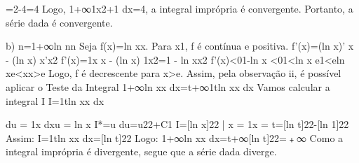                                  =2-4=4
         Logo, 1+∞1x2+1 dx=4, a integral imprópria é convergente.
         Portanto, a série dada é convergente.


        b) n=1+∞ln nn
            Seja f(x)=ln xx. Para x1, f é contínua e positiva.
                f'(x)=(ln x)'  x - (ln x)  x'x2
                f'(x)=1x  x - (ln x)  1x2=1 - ln xx2
                f'(x)<01-ln x <01<ln x
                e1<eln xe<xx>e
            Logo, f é decrescente para x>e. Assim, pela observação ii, é possível aplicar o Teste da Integral
                1+∞ln xx dx=t+∞1tln xx dx
             Vamos calcular a integral I
                 I=1tln xx dx    { du = 1x dxu = ln x
                 I*=u du=u22+C1
                 I=[ln x]22 |  x = 1x = t=[ln t]22-[ln 1]22
             Assim:
                 I=1tln xx dx=[ln t]22
             Logo:
                 1+∞ln xx dx=t+∞[ln t]22=﹢∞
             Como a integral imprópria é divergente, segue que a série dada diverge.

















































































































}
